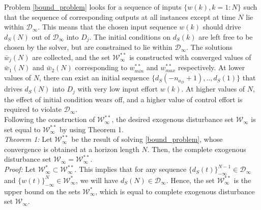 \documentclass[letterpaper, 10 pt, conference]{ieeeconf}  %
\begin{document}
	Problem \eqref{bound_problem} looks for a sequence of inputs $\{w(k), k={1:N}\}$ such that the sequence of corresponding outputs at all instances except at time $N$ lie within $\mathcal{D}_{\infty}$. This means that the chosen input sequence $w(k)$ should drive $d_S(N)$ out of $\mathcal{D}_{\infty}$ into $D_j$. The initial conditions on $d_S(k)$ are left free to be chosen by the solver, but are constrained to lie within $\mathcal{D}_{\infty}$.
	The solutions $\bar{w}_j(N)$ are collected, and the set $\mathcal{W}^{**}_{\infty}$ is constructed with converged values of $\bar{w}_1(N)$ and $\bar{w}_2(N)$ corresponding to $w^{**}_{min}$ and $w^{**}_{max}$ respectively.
	At lower values of $N$, there can exist an initial sequence $\{d_S(-n_{a_D}+1),..,d_S(1)\}$ that drives $d_S(N)$ into $D_j$ with very low input effort $w(k)$. At higher values of $N$, the effect of initial condition wears off, and a higher value of control effort is required to violate $\mathcal{D}_{\infty}$. 
	\\
	Following the construction of $\mathcal{W}^{**}_{\infty}$, the desired exogenous disturbance set $\mathcal{W}_{\infty}$ is set equal to $\mathcal{W}^{**}_{\infty}$ by using Theorem 1. \vspace{0.001cm}\\
	\indent
	\textit{Theorem 1:} Let $\mathcal{W}^{**}_{\infty}$ be the result of solving \eqref{bound_problem}, whose convergence is obtained at a horizon length $N$. Then, the complete exogenous disturbance set $\mathcal{W}_{\infty} = \mathcal{W}^{**}_{\infty}$. \\
	\indent
	\textit{Proof:} Let $\mathcal{W}^{*}_{\infty} \subset \mathcal{W}^{**}_{\infty}$. This implies that for any sequence $\{d_S(t)\}_{-\infty}^{N-1} \in \mathcal{D}_{\infty}$ and $\{w(t)\}_{-\infty}^N \in \mathcal{W}^*_{\infty}$, we will have $d_S(N) \in \mathcal{D}_{\infty}$. Hence, the set $\mathcal{W}^{**}_{\infty}$ is the upper bound on the sets $\mathcal{W}^{*}_{\infty}$, which is equal to complete exogenous disturbance set $\mathcal{W}_{\infty}$. 
\end{document}
